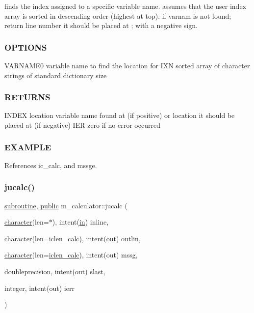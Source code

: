 finds the index assigned to a specific variable name. assumes that the user index array is sorted in descending order (highest at top). if varnam is not found; return line number it should be placed at ; with a negative sign. \subsubsection*{O\+P\+T\+I\+O\+NS}

V\+A\+R\+N\+A\+M\+E0 variable name to find the location for I\+XN sorted array of character strings of standard dictionary size \subsubsection*{R\+E\+T\+U\+R\+NS}

I\+N\+D\+EX location variable name found at (if positive) or location it should be placed at (if negative) I\+ER zero if no error occurred \subsubsection*{E\+X\+A\+M\+P\+LE}

References ic\+\_\+calc, and mssge.

\mbox{\label{namespacem__calculator_a7a98aaf2fb03204125187dfec671ce1f}} 
\subsubsection{\texorpdfstring{jucalc()}{jucalc()}}
{\footnotesize\ttfamily \hyperlink{M__stopwatch_83_8txt_acfbcff50169d691ff02d4a123ed70482}{subroutine}, \hyperlink{M__stopwatch_83_8txt_a2f74811300c361e53b430611a7d1769f}{public} m\+\_\+calculator\+::jucalc (\begin{DoxyParamCaption}\item[{\hyperlink{option__stopwatch_83_8txt_abd4b21fbbd175834027b5224bfe97e66}{character}(len=$\ast$), intent(\hyperlink{M__journal_83_8txt_afce72651d1eed785a2132bee863b2f38}{in})}]{inline,  }\item[{\hyperlink{option__stopwatch_83_8txt_abd4b21fbbd175834027b5224bfe97e66}{character}(len=\hyperlink{namespacem__calculator_accf705491e8bd9b3d2f0d04fd13712e7}{iclen\+\_\+calc}), intent(out)}]{outlin,  }\item[{\hyperlink{option__stopwatch_83_8txt_abd4b21fbbd175834027b5224bfe97e66}{character}(len=\hyperlink{namespacem__calculator_accf705491e8bd9b3d2f0d04fd13712e7}{iclen\+\_\+calc}), intent(out)}]{mssg,  }\item[{doubleprecision, intent(out)}]{slast,  }\item[{integer, intent(out)}]{ierr }\end{DoxyParamCaption})}



